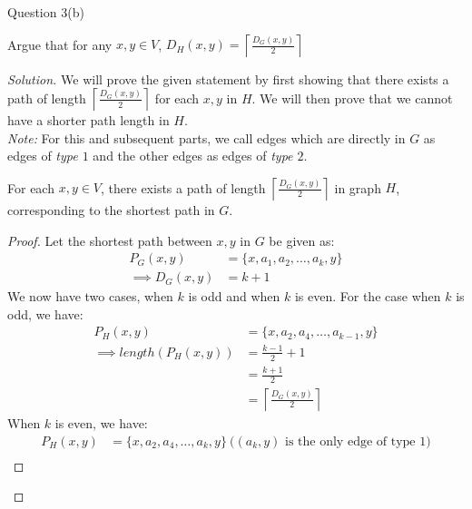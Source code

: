\begin{solution}{Question 3(b)}\label{ques:3b}
    \begin{question}
      Argue that for any $x, y \in V$, $\displaystyle D_H(x, y) = \left\lceil\frac{D_G(x, y)}{2}\right\rceil$
    \end{question}
    \tcblower{}
    \begin{proof}[Solution]
      We will prove the given statement by first showing that there exists a path of length $\left\lceil\frac{D_G(x, y)}{2}\right\rceil$ for each $x, y$ in $H$. We will then prove that we cannot have a shorter path length in $H$.\\
      \textit{Note:} For this and subsequent parts, we call edges which are directly in $G$ as edges of \textit{type $1$} and the other edges as edges of \textit{type $2$}.
      \begin{claim}\label{claim:Dh}
        For each $x, y \in V$, there exists a path of length $\left\lceil\frac{D_G(x, y)}{2}\right\rceil$ in graph $H$, corresponding to the shortest path in $G$.
      \end{claim}
      \begin{proof}
        Let the shortest path between $x, y$ in $G$ be given as:
        \begin{equation}
          \begin{split}
            P_G(x, y) &= \{x, a_1, a_2, \ldots, a_k, y\}\\
            \implies D_G(x, y) &= k + 1
          \end{split}
        \end{equation}
        We now have two cases, when $k$ is odd and when $k$ is even. For the case when $k$ is odd, we have:
        \begin{equation}
          \begin{split}
            P_H(x, y) &= \{x, a_2, a_4, \ldots, a_{k-1}, y\}\\
            \implies length(P_H(x, y)) &= \frac{k-1}{2} + 1\\
                                       &= \frac{k + 1}{2}\\
                                       &= \left\lceil\frac{D_G(x, y)}{2}\right\rceil
          \end{split}
        \end{equation}
        When $k$ is even, we have:
        \begin{equation}
          \begin{split}
            P_H(x, y) &= \{x, a_2, a_4, \ldots, a_k, y\}\ \text{($(a_k, y)$ is the only edge of type $1$)}\\

\end{split}
\end{equation}
\end{proof}
\end{proof}
\end{solution}
